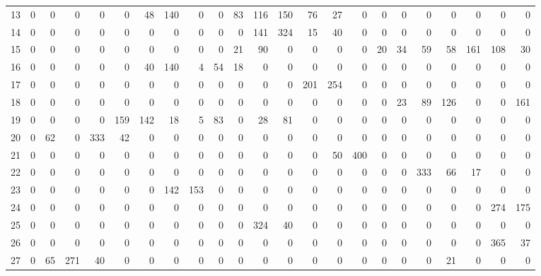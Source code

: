\documentclass[a4paper]{article}
\begin{document}
\begin{sidewaystable}[h!]
{\begin{tabular}{rrrrrrrrrrrrrrrrrrrrrrr}
  13 &   0 &   0 &   0 &   0 &   0 &  48 & 140 &   0 &   0 &  83 & 116 & 150 &  76 &  27 &   0 &   0 &   0 &   0 &   0 &   0 &   0 &   0 \\ 
  14 &   0 &   0 &   0 &   0 &   0 &   0 &   0 &   0 &   0 &   0 & 141 & 324 &  15 &  40 &   0 &   0 &   0 &   0 &   0 &   0 &   0 &   0 \\ 
  15 &   0 &   0 &   0 &   0 &   0 &   0 &   0 &   0 &   0 &  21 &  90 &   0 &   0 &   0 &   0 &  20 &  34 &  59 &  58 & 161 & 108 &  30 \\ 
  16 &   0 &   0 &   0 &   0 &   0 &  40 & 140 &   4 &  54 &  18 &   0 &   0 &   0 &   0 &   0 &   0 &   0 &   0 &   0 &   0 &   0 &   0 \\ 
  17 &   0 &   0 &   0 &   0 &   0 &   0 &   0 &   0 &   0 &   0 &   0 &   0 & 201 & 254 &   0 &   0 &   0 &   0 &   0 &   0 &   0 &   0 \\ 
  18 &   0 &   0 &   0 &   0 &   0 &   0 &   0 &   0 &   0 &   0 &   0 &   0 &   0 &   0 &   0 &   0 &  23 &  89 & 126 &   0 &   0 & 161 \\ 
  19 &   0 &   0 &   0 &   0 & 159 & 142 &  18 &   5 &  83 &   0 &  28 &  81 &   0 &   0 &   0 &   0 &   0 &   0 &   0 &   0 &   0 &   0 \\ 
  20 &   0 &  62 &   0 & 333 &  42 &   0 &   0 &   0 &   0 &   0 &   0 &   0 &   0 &   0 &   0 &   0 &   0 &   0 &   0 &   0 &   0 &   0 \\ 
  21 &   0 &   0 &   0 &   0 &   0 &   0 &   0 &   0 &   0 &   0 &   0 &   0 &   0 &  50 & 400 &   0 &   0 &   0 &   0 &   0 &   0 &   0 \\ 
  22 &   0 &   0 &   0 &   0 &   0 &   0 &   0 &   0 &   0 &   0 &   0 &   0 &   0 &   0 &   0 &   0 &   0 & 333 &  66 &  17 &   0 &   0 \\ 
  23 &   0 &   0 &   0 &   0 &   0 &   0 & 142 & 153 &   0 &   0 &   0 &   0 &   0 &   0 &   0 &   0 &   0 &   0 &   0 &   0 &   0 &   0 \\ 
  24 &   0 &   0 &   0 &   0 &   0 &   0 &   0 &   0 &   0 &   0 &   0 &   0 &   0 &   0 &   0 &   0 &   0 &   0 &   0 &   0 & 274 & 175 \\ 
  25 &   0 &   0 &   0 &   0 &   0 &   0 &   0 &   0 &   0 &   0 & 324 &  40 &   0 &   0 &   0 &   0 &   0 &   0 &   0 &   0 &   0 &   0 \\ 
  26 &   0 &   0 &   0 &   0 &   0 &   0 &   0 &   0 &   0 &   0 &   0 &   0 &   0 &   0 &   0 &   0 &   0 &   0 &   0 &   0 & 365 &  37 \\ 
  27 &   0 &  65 & 271 &  40 &   0 &   0 &   0 &   0 &   0 &   0 &   0 &   0 &   0 &   0 &   0 &   0 &   0 &   0 &  21 &   0 &   0 &   0 \\ 

\end{tabular}}
\end{sidewaystable}
\end{document}
